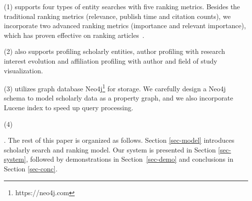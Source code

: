 \noindent (1) \oursystem supports four types of entity searches with five ranking metrics. Besides the traditional ranking metrics (relevance, publish time and citation counts), we incorporate two advanced ranking metrics (importance and relevant importance), which has proven effective on ranking articles~\cite{ma2018query}.

\noindent (2) \oursystem also supports profiling scholarly entities, \eg author profiling with research interest evolution and affiliation profiling with author and field of study visualization.

\noindent  (3) \oursystem utilizes graph database Neo4j\footnote{https://neo4j.com} for storage. We carefully design a Neo4j schema to model scholarly data as a property graph, and we also incorporate Lucene index to speed up query processing.


\noindent (4) 



.
The rest of this paper is organized as follows. Section \ref{sec-model} introduces scholarly search and ranking model. Our \oursystem system is presented in Section \ref{sec-system}, followed by demonstrations in Section~\ref{sec-demo} and conclusions in Section \ref{sec-conc}.





